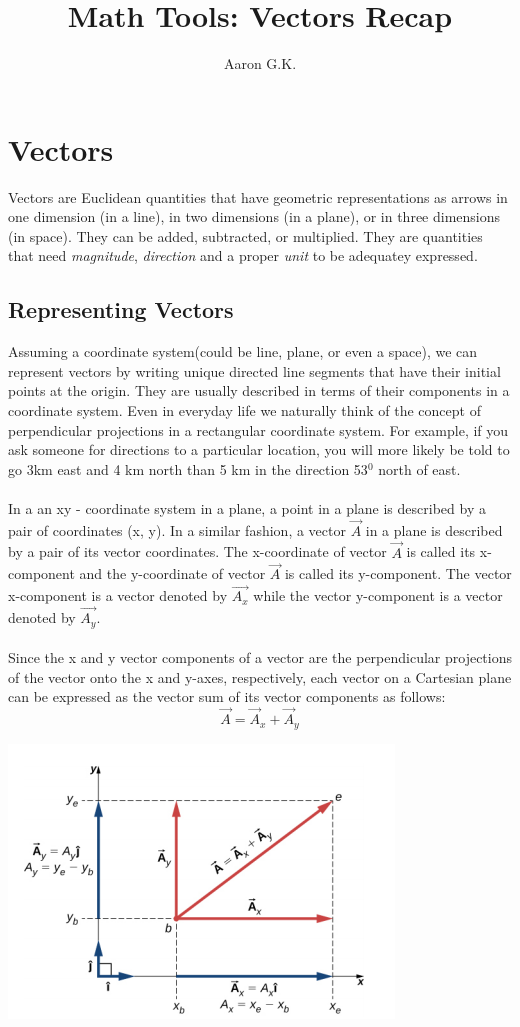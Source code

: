 \documentclass[9pt]{article}
\title{Math Tools: Vectors Recap}
\author{Aaron G.K.}
\begin{document}
\maketitle
\section*{Vectors}
Vectors are Euclidean quantities that have geometric representations as arrows in one dimension (in a line), in two dimensions (in a plane), or in three dimensions (in space). They can be added, subtracted, or multiplied. They are quantities that need \textit{magnitude}, \textit{direction} and a proper \textit{unit} to be adequatey expressed.
\subsection*{Representing Vectors}
Assuming a coordinate system(could be  line, plane, or even a space), we can represent vectors by writing unique directed line segments that have their initial points at the origin. They are usually described in terms of their components in a coordinate system. Even in everyday life we naturally think of the concept of perpendicular projections in a rectangular coordinate system. For example, if you ask someone for directions to a particular location, you will more likely be told to go 3km east and 4 km north than 5 km in the direction 53$^0$ north of east.\\ \\
In a an xy - coordinate system in a plane, a point in a plane is described by a pair of coordinates (x, y). In a similar fashion, a vector  $\vec{A}$ in a plane is described by a pair of its vector coordinates. The x-coordinate of vector  $\vec{A}$ is called its x-component and the y-coordinate of vector  $\vec{A}$ is called its y-component. The vector x-component is a vector denoted by  $\vec{A_x}$ while the vector y-component is a vector denoted by  $\vec{A_y}$. \\ \\
Since the x and y vector components of a vector are the perpendicular projections of the vector onto the  x and  y-axes, respectively, each vector on a Cartesian plane can be expressed as the vector sum of its vector components as follows:
$$\vec{A} = \vec{A}_{x} + \vec{A}_{y} $$
\begin{center}
	\includegraphics[scale=0.5]{cartesian_plane}
\end{center}
\end{document}
